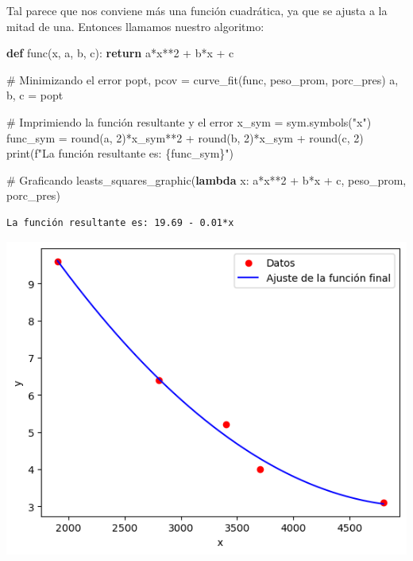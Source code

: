 \documentclass[
  letterpaper,
  DIV=11,
  numbers=noendperiod]{scrartcl}
\newenvironment{Shaded}{\begin{snugshade}}{\end{snugshade}}
\newcommand{\BuiltInTok}[1]{\textcolor[rgb]{0.00,0.23,0.31}{#1}}
\newcommand{\CommentTok}[1]{\textcolor[rgb]{0.37,0.37,0.37}{#1}}
\newcommand{\ControlFlowTok}[1]{\textcolor[rgb]{0.00,0.23,0.31}{\textbf{#1}}}
\newcommand{\DecValTok}[1]{\textcolor[rgb]{0.68,0.00,0.00}{#1}}
\newcommand{\KeywordTok}[1]{\textcolor[rgb]{0.00,0.23,0.31}{\textbf{#1}}}
\newcommand{\NormalTok}[1]{\textcolor[rgb]{0.00,0.23,0.31}{#1}}
\newcommand{\OperatorTok}[1]{\textcolor[rgb]{0.37,0.37,0.37}{#1}}
\newcommand{\SpecialCharTok}[1]{\textcolor[rgb]{0.37,0.37,0.37}{#1}}
\newcommand{\SpecialStringTok}[1]{\textcolor[rgb]{0.13,0.47,0.30}{#1}}
\newcommand{\StringTok}[1]{\textcolor[rgb]{0.13,0.47,0.30}{#1}}
\begin{document}
Tal parece que nos conviene más una función cuadrática, ya que se ajusta
a la mitad de una. Entonces llamamos nuestro algoritmo:

\begin{Shaded}
\begin{Highlighting}[]

\KeywordTok{def}\NormalTok{ func(x, a, b, c):}
    \ControlFlowTok{return}\NormalTok{ a}\OperatorTok{*}\NormalTok{x}\OperatorTok{**}\DecValTok{2} \OperatorTok{+}\NormalTok{ b}\OperatorTok{*}\NormalTok{x }\OperatorTok{+}\NormalTok{ c}

\CommentTok{\# Minimizando el error}
\NormalTok{popt, pcov }\OperatorTok{=}\NormalTok{ curve\_fit(func, peso\_prom, porc\_pres)}
\NormalTok{a, b, c }\OperatorTok{=}\NormalTok{ popt}

\CommentTok{\# Imprimiendo la función resultante y el error}
\NormalTok{x\_sym }\OperatorTok{=}\NormalTok{ sym.symbols(}\StringTok{"x"}\NormalTok{)}
\NormalTok{func\_sym }\OperatorTok{=} \BuiltInTok{round}\NormalTok{(a, }\DecValTok{2}\NormalTok{)}\OperatorTok{*}\NormalTok{x\_sym}\OperatorTok{**}\DecValTok{2} \OperatorTok{+} \BuiltInTok{round}\NormalTok{(b, }\DecValTok{2}\NormalTok{)}\OperatorTok{*}\NormalTok{x\_sym }\OperatorTok{+} \BuiltInTok{round}\NormalTok{(c, }\DecValTok{2}\NormalTok{)}
\BuiltInTok{print}\NormalTok{(}\SpecialStringTok{f"La función resultante es: }\SpecialCharTok{\{}\NormalTok{func\_sym}\SpecialCharTok{\}}\SpecialStringTok{"}\NormalTok{)}

\CommentTok{\# Graficando}
\NormalTok{leasts\_squares\_graphic(}\KeywordTok{lambda}\NormalTok{ x: a}\OperatorTok{*}\NormalTok{x}\OperatorTok{**}\DecValTok{2} \OperatorTok{+}\NormalTok{ b}\OperatorTok{*}\NormalTok{x }\OperatorTok{+}\NormalTok{ c, peso\_prom, porc\_pres)}
\end{Highlighting}
\end{Shaded}

\begin{verbatim}
La función resultante es: 19.69 - 0.01*x
\end{verbatim}

\includegraphics{Tarea8_MN_files/figure-pdf/cell-20-output-2.png}
\end{document}
